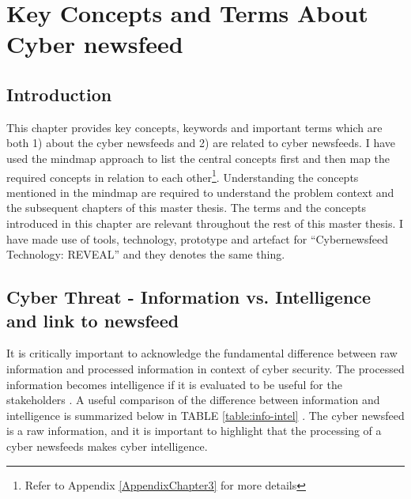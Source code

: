 
\chapter{Key Concepts and Terms About Cyber newsfeed} %

\label{Chapter3key_concepts-and-terms} %





\section{Introduction} 
This chapter provides key concepts, 
keywords and important terms which are both 
1) about the cyber newsfeeds and 
2) are related to cyber newsfeeds.
I have used the mindmap approach \citep{buzan2006mind}  
to list the central concepts first 
and then map the required concepts 
in relation to each other\footnote{Refer to Appendix \ref{AppendixChapter3} for more details}. 
Understanding the concepts mentioned in the mindmap 
are required to understand the problem context 
and the subsequent chapters of this master thesis. 
The terms and the concepts introduced in this chapter 
are relevant throughout the rest of this master thesis. I have made use of tools, technology, prototype and artefact for \enquote{Cybernewsfeed Technology: REVEAL} and they denotes the same thing.



\section{Cyber Threat - Information vs. Intelligence and link to newsfeed}
It is critically important to acknowledge  
the fundamental difference between 
raw information and processed information in context of cyber security. 
The processed information becomes intelligence 
if it is evaluated to be useful for the stakeholders \citep{liew2013dikiw}. 
A useful comparison of the difference between information and intelligence is summarized below in 
TABLE \ref{table:info-intel} \citep{threat-intelligence}.
The cyber newsfeed is a raw information, and it is important to highlight that the processing of a cyber newsfeeds makes cyber intelligence.

\FloatBarrier



